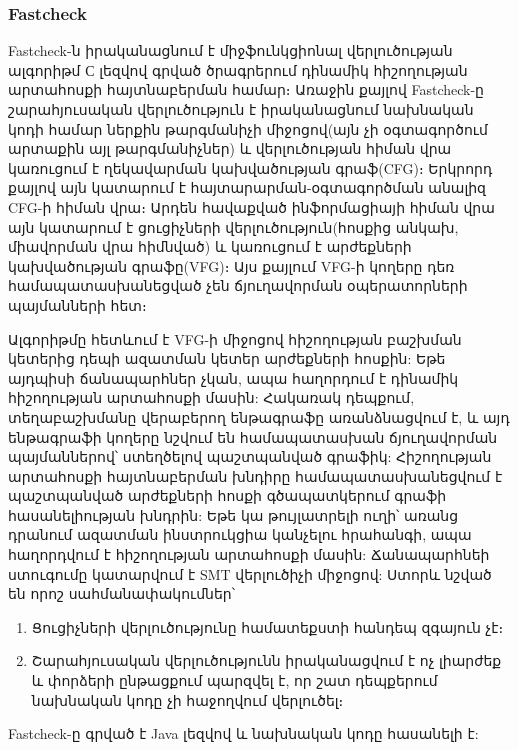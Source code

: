 \subsubsection{Fastcheck}
Fastcheck\cite{Cherem2007}-ն իրականացնում է միջֆունկցիոնալ վերլուծության ալգորիթմ С լեզվով գրված ծրագրերում դինամիկ
հիշողության արտահոսքի հայտնաբերման համար։ Առաջին քայլով Fastcheck-ը շարահյուսական վերլուծություն է իրականացնում նախնական
կոդի համար ներքին թարգմանիչի միջոցով(այն չի օգտագործում արտաքին այլ թարգմանիչներ) և վերլուծության հիման վրա կառուցում է
ղեկավարման կախվածության գրաֆ(CFG)։ Երկրորդ քայլով այն կատարում է հայտարարման-օգտագործման անալիզ CFG-ի հիման վրա։ Արդեն
հավաքված ինֆորմացիայի հիման վրա այն կատարում է ցուցիչների վերլուծություն(հոսքից անկախ, միավորման վրա հիմնված) և
կառուցում է արժեքների կախվածության գրաֆը(VFG)։ Այս քայլում VFG-ի կողերը դեռ համապատասխանեցված չեն ճյուղավորման
օպերատորների պայմանների հետ։

Ալգորիթմը հետևում է VFG-ի միջոցով հիշողության բաշխման կետերից դեպի ազատման կետեր արժեքների հոսքին: Եթե այդպիսի
ճանապարհներ չկան, ապա հաղորդում է դինամիկ հիշողության արտահոսքի մասին: Հակառակ դեպքում, տեղաբաշխմանը վերաբերող ենթագրաֆը
առանձնացվում է, և այդ ենթագրաֆի կողերը նշվում են համապատասխան ճյուղավորման պայմաններով՝ ստեղծելով պաշտպանված գրաֆիկ:
Հիշողության արտահոսքի հայտնաբերման խնդիրը համապատասխանեցվում է պաշտպանված արժեքների հոսքի գծապատկերում գրաֆի
հասանելիության խնդրին: Եթե կա թույլատրելի ուղի՝ առանց դրանում ազատման ինստրուկցիա կանչելու հրահանգի, ապա հաղորդվում է
հիշողության արտահոսքի մասին: Ճանապարհնեի ստուգումը կատարվում է SMT վերլուծիչի միջոցով: Ստորև նշված են որոշ
սահմանափակումներ՝
\begin{enumerate}
\item Ցուցիչների վերլուծությունը համատեքստի հանդեպ զգայուն չէ։
\item Շարահյուսական վերլուծությունն իրականացվում է ոչ լիարժեք և փորձերի ընթացքում պարզվել է, որ շատ դեպքերում նախնական
կոդը չի հաջողվում վերլուծել։
\end{enumerate}

Fastcheck-ը գրված է Java լեզվով և նախնական կոդը հասանելի է\cite{Fastcheck}:

